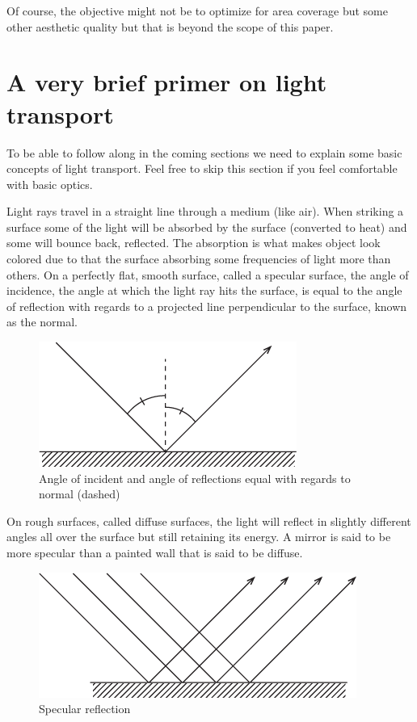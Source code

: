 \documentclass{article}
\begin{document}
Of course, the objective might not be to optimize for area coverage but
some other aesthetic quality but that is beyond the scope of this paper.

\section{A very brief primer on light transport}

To be able to follow along in the coming sections we need to explain
some basic concepts of light transport. Feel free to skip this section
if you feel comfortable with basic optics.

Light rays travel in a straight line through a medium (like air). When
striking a surface some of the light will be absorbed by the surface
(converted to heat) and some will bounce back, reflected. The absorption
is what makes object look colored due to that the surface absorbing
some frequencies of light more than others. On a perfectly flat, smooth
surface, called a specular surface, the angle of incidence, the angle at
which the light ray hits the surface, is equal to the angle of
reflection with regards to a projected line perpendicular to the
surface, known as the normal.

\begin{figure}[ht!]
\centering
\includegraphics{images/reflection.png}
\caption{Angle of incident and angle of reflections equal with regards to normal (dashed)}
\end{figure}


On rough surfaces, called diffuse surfaces, the light will reflect in
slightly different angles all over the surface but still retaining its
energy. A mirror is said to be more specular than a painted wall that is
said to be diffuse.

\begin{figure}[ht!]
\centering
\includegraphics{images/specular-reflection.png}
\caption{Specular reflection}
\end{figure}
\end{document}
